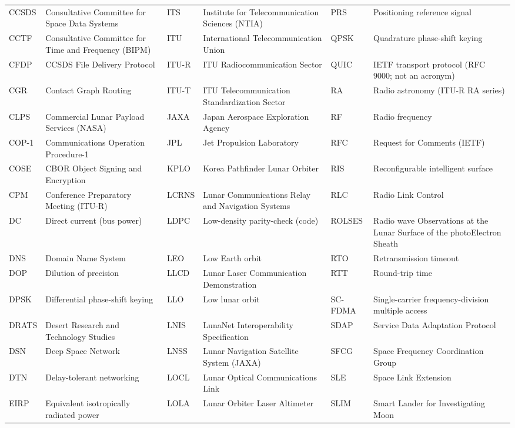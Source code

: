 \documentclass{IEEEoj}
\begin{document}
\begin{table}[!t]
\begin{tabularx}{\textwidth}{@{}l>{\raggedright\arraybackslash}Xl>{\raggedright\arraybackslash}Xl>{\raggedright\arraybackslash}X}
CCSDS & Consultative Committee for Space Data Systems & ITS & Institute for Telecommunication Sciences (NTIA) & PRS & Positioning reference signal \\
CCTF & Consultative Committee for Time and Frequency (BIPM) & ITU & International Telecommunication Union & QPSK & Quadrature phase-shift keying \\
CFDP & CCSDS File Delivery Protocol & ITU-R & ITU Radiocommunication Sector & QUIC & IETF transport protocol (RFC 9000; not an acronym) \\
CGR & Contact Graph Routing & ITU-T & ITU Telecommunication Standardization Sector & RA & Radio astronomy (ITU-R RA series) \\
CLPS & Commercial Lunar Payload Services (NASA) & JAXA & Japan Aerospace Exploration Agency & RF & Radio frequency \\
COP-1 & Communications Operation Procedure-1 & JPL & Jet Propulsion Laboratory & RFC & Request for Comments (IETF) \\
COSE & CBOR Object Signing and Encryption & KPLO & Korea Pathfinder Lunar Orbiter & RIS & Reconfigurable intelligent surface \\
CPM & Conference Preparatory Meeting (ITU-R) & LCRNS & Lunar Communications Relay and Navigation Systems & RLC & Radio Link Control \\
DC & Direct current (bus power) & LDPC & Low-density parity-check (code) & ROLSES & Radio wave Observations at the Lunar Surface of the photoElectron Sheath \\
DNS & Domain Name System & LEO & Low Earth orbit & RTO & Retransmission timeout \\
DOP & Dilution of precision & LLCD & Lunar Laser Communication Demonstration & RTT & Round-trip time \\
DPSK & Differential phase-shift keying & LLO & Low lunar orbit & SC-FDMA & Single-carrier frequency-division multiple access \\
DRATS & Desert Research and Technology Studies & LNIS & LunaNet Interoperability Specification & SDAP & Service Data Adaptation Protocol \\
DSN & Deep Space Network & LNSS & Lunar Navigation Satellite System (JAXA) & SFCG & Space Frequency Coordination Group \\
DTN & Delay-tolerant networking & LOCL & Lunar Optical Communications Link & SLE & Space Link Extension \\
EIRP & Equivalent isotropically radiated power & LOLA & Lunar Orbiter Laser Altimeter & SLIM & Smart Lander for Investigating Moon \\

\end{tabularx}
\end{table}
\end{document}
